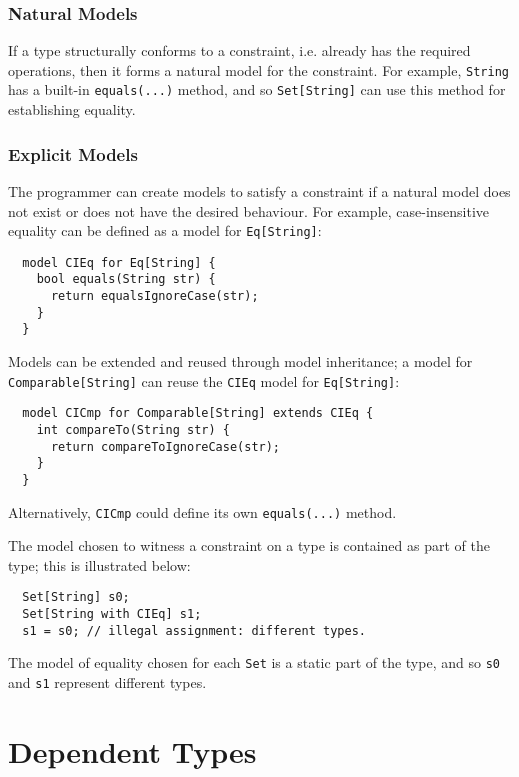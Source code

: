 \subsubsection{Natural Models}

If a type structurally conforms to a constraint, i.e. already has the required operations, then it forms a natural model for the constraint. For example, \texttt{String} has a built-in \texttt{equals(...)} method, and so \texttt{Set[String]} can use this method for establishing equality.

\subsubsection{Explicit Models}

The programmer can create models to satisfy a constraint if a natural model does not exist or does not have the desired behaviour. For example, case-insensitive equality can be defined as a model for \texttt{Eq[String]}:

\begin{verbatim}
  model CIEq for Eq[String] {
    bool equals(String str) {
      return equalsIgnoreCase(str);
    }
  }
\end{verbatim}

Models can be extended and reused through model inheritance; a model for \texttt{Comparable[String]} can reuse the \texttt{CIEq} model for \texttt{Eq[String]}:

\begin{verbatim}
  model CICmp for Comparable[String] extends CIEq {
    int compareTo(String str) {
      return compareToIgnoreCase(str);
    }
  }
\end{verbatim}
Alternatively, \texttt{CICmp} could define its own \texttt{equals(...)} method.
    
The model chosen to witness a constraint on a type is contained as part of the type; this is illustrated below:

\begin{verbatim}
  Set[String] s0;
  Set[String with CIEq] s1;
  s1 = s0; // illegal assignment: different types.
\end{verbatim}

The model of equality chosen for each \texttt{Set} is a static part of the type, and so \texttt{s0} and \texttt{s1} represent different types.

\section{Dependent Types}


